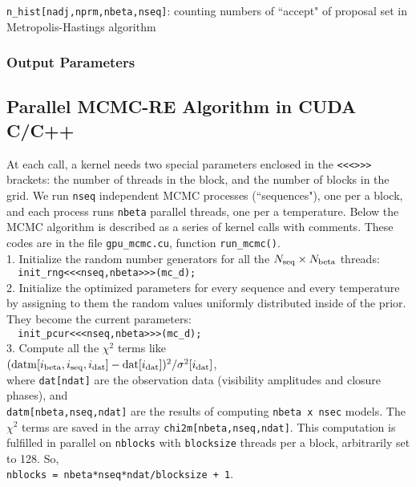 \documentclass[preprint2]{aastex}
\begin{document}
\verb|n_hist[nadj,nprm,nbeta,nseq]|: counting numbers of ``accept" of proposal set
                              in Metropolis-Hastings algorithm



\subsubsection{Output Parameters}





\subsection{Parallel MCMC-RE Algorithm in CUDA C/C++}\label{kernels}

At each call, a kernel needs two special parameters enclosed in the \verb|<<<>>>| brackets:
the number of threads in the block, and the number of blocks in the grid. We run \verb|nseq|
independent MCMC processes (``sequences"), one per a block, and each process runs \verb|nbeta|
parallel threads, one per a temperature. Below the MCMC algorithm is described as a series of
kernel calls with comments. These codes are in the file \verb|gpu_mcmc.cu|, function \verb|run_mcmc()|. \\

1. Initialize the random number generators for all the $N_{\rm seq} \times N_{\rm beta}$ threads: \\ 
\verb|  init_rng<<<nseq,nbeta>>>(mc_d);| \\

2. Initialize the optimized parameters for every sequence and every temperature by assigning to them the random values uniformly distributed inside of the prior. They become the current parameters: \\
\verb|  init_pcur<<<nseq,nbeta>>>(mc_d);| \\

3. Compute all the $\chi^2$ terms like \\
$({\rm datm}[i_{\rm beta},i_{\rm seq},i_{\rm dat}] - {\rm dat}[i_{\rm dat}])^2/\sigma^2[i_{\rm dat}]$, \\
where \verb|dat[ndat]| are the observation data (visibility amplitudes and closure phases), and \\
\verb|datm[nbeta,nseq,ndat]| are the results of computing \verb|nbeta x nsec| models. The $\chi^2$ terms are 
saved in the array \verb|chi2m[nbeta,nseq,ndat]|. This computation is fulfilled in parallel on \verb|nblocks| with \verb|blocksize| threads per a block, arbitrarily set to 128. So, \\ 
\verb|nblocks = nbeta*nseq*ndat/blocksize + 1|. \\
\end{document}
